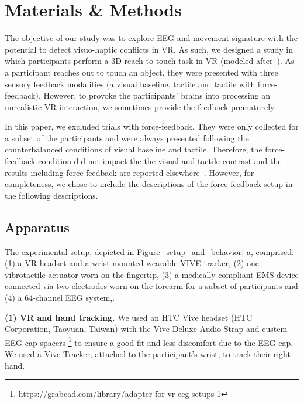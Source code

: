 \section{Materials \& Methods}
The objective of our study was to explore EEG and movement signature with the potential to detect visuo-haptic conflicts in VR. As such, we designed a study in which participants perform a 3D reach-to-touch task in VR (modeled after~\cite{singh_visual_2018}). As a participant reaches out to touch an object, they were presented with three sensory feedback modalities (a visual baseline, tactile and tactile with force-feedback). However, to provoke the participants' brains into processing an unrealistic VR interaction, we sometimes provide the feedback prematurely. 

In this paper, we excluded trials with force-feedback. They were only collected for a subset of the participants and were always presented following the counterbalanced conditions of visual baseline and tactile. Therefore, the force-feedback condition did not impact the the visual and tactile contrast and the results including force-feedback are reported elsewhere~\cite{Gehrke2018}. However, for completeness, we chose to include the descriptions of the force-feedback setup in the following descriptions.

\subsection{Apparatus}
The experimental setup, depicted in Figure~\ref{setup_and_behavior} a, comprised: (1) a VR headset and a wrist-mounted wearable VIVE tracker, (2) one vibrotactile actuator worn on the fingertip, (3) a medically-compliant EMS device connected via two electrodes worn on the forearm for a subset of participants and (4) a 64-channel EEG system,.


\textbf{(1) VR and hand tracking.} We used an HTC Vive headset (HTC Corporation, Taoyuan, Taiwan) with the Vive Deluxe Audio Strap and custem EEG cap spacers \footnote{https://grabcad.com/library/adapter-for-vr-eeg-setups-1} to ensure a good fit and less discomfort due to the EEG cap. We used a Vive Tracker, attached to the participant's wrist, to track their right hand. 

